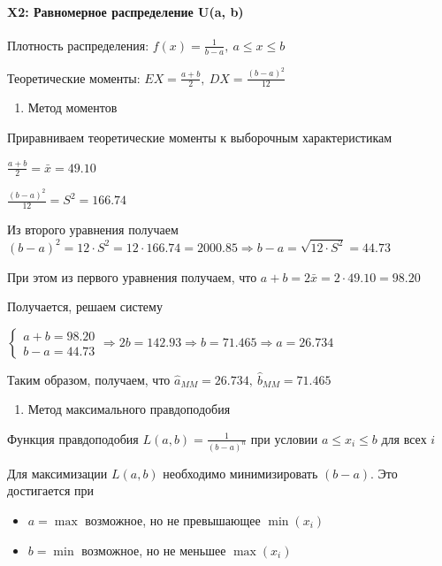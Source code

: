 \documentclass[11pt]{article}
\providecommand{\tightlist}{%
      \setlength{\itemsep}{0pt}\setlength{\parskip}{0pt}}
\begin{document}
    \paragraph{X2: Равномерное распределение U(a,
b)}\label{x2-ux440ux430ux432ux43dux43eux43cux435ux440ux43dux43eux435-ux440ux430ux441ux43fux440ux435ux434ux435ux43bux435ux43dux438ux435-ua-b}

Плотность распределения: \(f(x) = \frac{1}{b - a}, \ a \leq x \leq b\)

Теоретические моменты:
\(EX = \frac{a + b}{2}, \ DX = \frac{(b - a)^2}{12}\)

\begin{enumerate}
\def\labelenumi{\arabic{enumi}.}
\tightlist
\item
  Метод моментов
\end{enumerate}

Приравниваем теоретические моменты к выборочным характеристикам

\(\frac{a + b}{2} = \bar{x} = 49.10\)

\(\frac{(b - a)^2}{12} = S^2 = 166.74\)

Из второго уравнения получаем
\((b - a)^2 = 12 \cdot S^2 = 12 \cdot 166.74 = 2000.85 \Rightarrow b - a = \sqrt{12 \cdot S^2} = 44.73\)

При этом из первого уравнения получаем, что
\(a + b = 2 \bar{x} = 2 \cdot 49.10 = 98.20\)

Получается, решаем систему

\(\left\{\begin{array}{c}
a + b = 98.20 \\
b - a = 44.73
\end{array}\right. \Rightarrow 2b = 142.93 \Rightarrow b = 71.465 \Rightarrow a = 26.734\)

Таким образом, получаем, что
\(\hat{a}_{MM} = 26.734, \ \hat{b}_{MM} = 71.465\)

\begin{enumerate}
\def\labelenumi{\arabic{enumi}.}
\setcounter{enumi}{1}
\tightlist
\item
  Метод максимального правдоподобия
\end{enumerate}

Функция правдоподобия \(L(a, b) = \frac{1}{(b - a)^n}\) при условии
\(a \leq x_i \leq b\) для всех \(i\)

Для максимизации \(L(a, b)\) необходимо минимизировать \((b - a)\). Это
достигается при

\begin{itemize}
\tightlist
\item
  \(a = \max\) возможное, но не превышающее \(\min(x_i)\)
\item
  \(b = \min\) возможное, но не меньшее \(\max(x_i)\)
\end{itemize}
\end{document}

